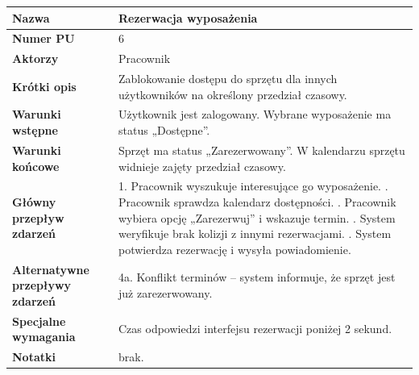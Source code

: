 \documentclass{article}
\begin{document}
    \begin{tabular}{|m{10em}|m{30em}|}
        \hline
        \textbf{Nazwa} & Rezerwacja wyposażenia \\
        \hline
        \textbf{Numer PU} & 6 \\
        \hline
        \textbf{Aktorzy} & Pracownik \\
        \hline
        \textbf{Krótki opis} & Zablokowanie dostępu do sprzętu dla innych użytkowników na określony przedział czasowy. \\
        \hline
        \textbf{Warunki wstępne} & Użytkownik jest zalogowany. Wybrane wyposażenie ma status „Dostępne”. \\
        \hline
        \textbf{Warunki końcowe} & Sprzęt ma status „Zarezerwowany”. W kalendarzu sprzętu widnieje zajęty przedział czasowy. \\
        \hline
        \textbf{Główny przepływ zdarzeń} & 
            1. Pracownik wyszukuje interesujące go wyposażenie. \newline
            2. Pracownik sprawdza kalendarz dostępności. \newline
            3. Pracownik wybiera opcję „Zarezerwuj” i wskazuje termin. \newline
            4. System weryfikuje brak kolizji z innymi rezerwacjami. \newline
            5. System potwierdza rezerwację i wysyła powiadomienie. \\
        \hline
        \textbf{Alternatywne przepływy zdarzeń} & 
            4a. Konflikt terminów – system informuje, że sprzęt jest już zarezerwowany. \\
        \hline
        \textbf{Specjalne wymagania} & Czas odpowiedzi interfejsu rezerwacji poniżej 2 sekund. \\
        \hline
        \textbf{Notatki} & brak. \\
        \hline
    \end{tabular}

    \vspace{1cm}
\end{document}
